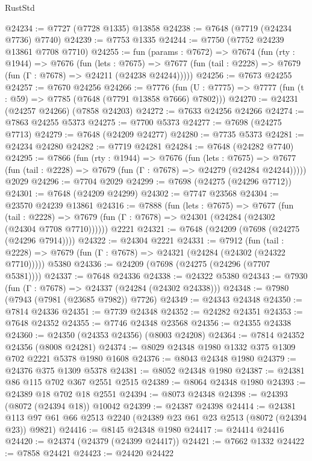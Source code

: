 \begin{lexlean}{RustStd}
\begin{coremodule}
{\begin{coremodule}
{{{{{{{{{{{{{{{{{{{{{{{{{{{{{{{{{{{{{{{{{{{{{{{{{{{{{@24234 := @7727 (@7728 @1335) @13858
@24238 := @7648 (@7719 (@24234 @7736) @7740)
@24239 := @7753 @1335
@24244 := @7750 (@7752 @24239 @13861 @7708 @7710)
@24255 := fun (params : @7672) =>
  @7674
    (fun (rty : @1944) =>
    @7676
      (fun (lets : @7675) =>
      @7677 (fun (tail : @2228) => @7679 (fun (Γ : @7678) => @24211 (@24238 @24244)))))
@24256 := @7673 @24255
@24257 := @7670 @24256
@24266 := @7776
    (fun (U : @7775) => @7777 (fun (t : @59) => @7785 (@7648 (@7791 @13858 @7666) @7802)))
@24270 := @24231 (@24257 @24266) (@7858 @24203)
@24272 := @7633 @24256 @24266
@24274 := @7863 @24255 @5373
@24275 := @7700 @5373
@24277 := @7698 (@24275 @7713)
@24279 := @7648 (@24209 @24277)
@24280 := @7735 @5373
@24281 := @24234 @24280
@24282 := @7719 @24281
@24284 := @7648 (@24282 @7740)
@24295 := @7866
    (fun (rty : @1944) =>
    @7676
      (fun (lets : @7675) =>
      @7677 (fun (tail : @2228) => @7679 (fun (Γ : @7678) => @24279 (@24284 @24244)))))
    @2029
@24296 := @7704 @2029
@24299 := @7698 (@24275 (@24296 @7712))
@24301 := @7648 (@24209 @24299)
@24302 := @7747 @23568
@24304 := @23570 @24239 @13861
@24316 := @7888
    (fun (lets : @7675) =>
    @7677
      (fun (tail : @2228) =>
      @7679 (fun (Γ : @7678) => @24301 (@24284 (@24302 (@24304 @7708 @7710))))))
    @2221
@24321 := @7648 (@24209 (@7698 (@24275 (@24296 @7914))))
@24322 := @24304 @2221
@24331 := @7912
    (fun (tail : @2228) => @7679 (fun (Γ : @7678) => @24321 (@24284 (@24302 (@24322 @7710)))))
    @5380
@24336 := @24209 (@7698 (@24275 (@24296 (@7707 @5381))))
@24337 := @7648 @24336
@24338 := @24322 @5380
@24343 := @7930 (fun (Γ : @7678) => @24337 (@24284 (@24302 @24338)))
@24348 := @7980 (@7943 (@7981 (@23685 @7982)) @7726)
@24349 := @24343 @24348
@24350 := @7814 @24336
@24351 := @7739 @24348
@24352 := @24282 @24351
@24353 := @7648 @24352
@24355 := @7746 @24348 @23568
@24356 := @24355 @24338
@24360 := @24350 (@24353 @24356) (@8003 @24208)
@24364 := @7814 @24352 @24356 (@8008 @24281)
@24374 := @8029 @24348 @1980 @1332 @375 @1309 @702 @2221 @5378 @1980 @1608
@24376 := @8043 @24348 @1980
@24379 := @24376 @375 @1309 @5378
@24381 := @8052 @24348 @1980
@24387 := @24381 @86 @115 @702 @367 @2551 @2515
@24389 := @8064 @24348 @1980
@24393 := @24389 @18 @702 @18 @2551
@24394 := @8073 @24348
@24398 := @24393 (@8072 (@24394 @18)) @10042
@24399 := @24387 @24398
@24414 := @24381 @113 @97 @61 @66 @2513 @2240 (@24389 @23 @61 @23 @2513 (@8072 (@24394 @23)) @9821)
@24416 := @8145 @24348 @1980
@24417 := @24414 @24416
@24420 := @24374 (@24379 (@24399 @24417))
@24421 := @7662 @1332
@24422 := @7858 @24421
@24423 := @24420 @24422
}}}}}}}}}}}}}}}}}}}}}}}}}}}}}}}}}}}}}}}}}}}}}}}}}}}}}
\end{coremodule}}
\end{coremodule}
\end{lexlean}
